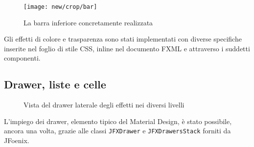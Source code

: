             \begin{figure}[htbp]
                \centering
                \texttt{[image: new/crop/bar]}
                \caption{La barra inferiore concretamente realizzata}
                \label{fig:newBar}
            \end{figure}

            Gli effetti di colore e trasparenza sono stati implementati con diverse specifiche inserite nel foglio di stile CSS, inline nel documento FXML e attraverso i suddetti componenti.

        \subsection{Drawer, liste e celle}\label{subsec:drawerCelle}
            \begin{figure}[htbp]
                \centering%
                \qquad{\LARGE$\Rightarrow$}\qquad
                \qquad{\LARGE$\Rightarrow$}\qquad
                \caption{Vista del drawer laterale degli effetti nei diversi livelli\label{fig:impl:allEffects}}
            \end{figure}


            L'impiego dei drawer, elemento tipico del Material Design, è stato possibile, ancora una volta, grazie alle classi \texttt{JFXDrawer} e \texttt{JFXDrawersStack} forniti da JFoenix.

